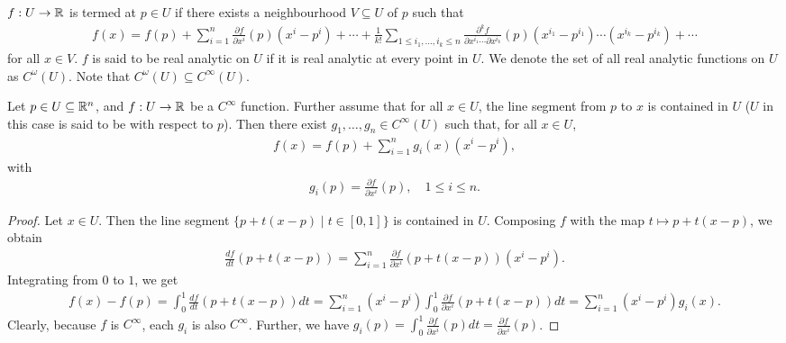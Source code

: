 $f:U \to \mathbb{R}$ is termed  at $p \in U$ if there exists a neighbourhood $V \subseteq U$ of $p$ such that
\begin{align}
    f(x) = f(p) + \sum_{i=1}^{n} \frac{\partial f}{\partial x^{i}}(p)(x^{i}-p^{i}) + \cdots + \frac{1}{k!} \sum_{1 \leq i_{1},\ldots,i_{k} \leq n} \frac{\partial^{k} f}{\partial x^{i_{1}} \cdots \partial x^{i_{k}}}(p)(x^{i_{1}}-p^{i_{1}}) \cdots (x^{i_{k}}-p^{i_{k}}) + \cdots
\end{align}
for all $x \in V$. $f$ is said to be real analytic on $U$ if it is real analytic at every point in $U$. We denote the set of all real analytic functions on $U$ as $C^{\omega}(U)$. Note that $C^{\omega}(U) \subseteq C^{\infty}(U)$.

\begin{theorem}
    Let $p \in U \subseteq \mathbb{R}^{n}$, and $f:U \to \mathbb{R}$ be a $C^{\infty}$ function. Further assume that for all $x \in U$, the line segment from $p$ to $x$ is contained in $U$ ($U$ in this case is said to be  with respect to $p$). Then there exist $g_{1},\ldots,g_{n} \in C^{\infty}(U)$ such that, for all $x \in U$,
    \begin{align}
        f(x) = f(p) + \sum_{i=1}^{n} g_{i}(x)(x^{i}-p^{i}),
    \end{align}
    with
    \begin{align}
        g_{i}(p) = \frac{\partial f}{\partial x^{i}}(p), \quad 1 \leq i \leq n.
    \end{align}
\end{theorem}
\begin{proof}
    Let $x \in U$. Then the line segment $\{p+t(x-p) \mid t \in [0,1]\}$ is contained in $U$. Composing $f$ with the map $t \mapsto p+t(x-p)$, we obtain
    \begin{align}
        \frac{df}{dt}(p+t(x-p)) = \sum_{i=1}^{n} \frac{\partial f}{\partial x^{i}}(p+t(x-p))(x^{i}-p^{i}).
    \end{align}
    Integrating from $0$ to $1$, we get
    \begin{align}
        f(x) - f(p) = \int_{0}^{1} \frac{df}{dt}(p+t(x-p)) dt = \sum_{i=1}^{n} (x^{i}-p^{i}) \int_{0}^{1} \frac{\partial f}{\partial x^{i}}(p+t(x-p)) dt = \sum_{i=1}^{n} (x^{i}-p^{i}) g_{i}(x).
    \end{align}
    Clearly, because $f$ is $C^{\infty}$, each $g_{i}$ is also $C^{\infty}$. Further, we have $g_{i}(p) = \int_{0}^{1} \frac{\partial f}{\partial x^{i}}(p) dt = \frac{\partial f}{\partial x^{i}}(p)$.
\end{proof}

